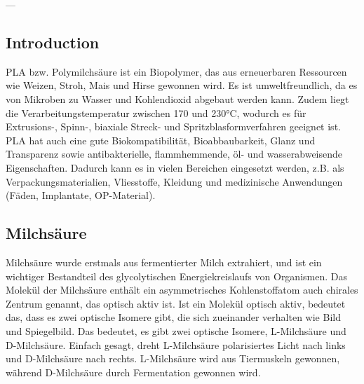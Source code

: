 \documentclass[10pt]{article}
\begin{document}
    ---

    \subsection{Introduction}
    PLA bzw. Polymilchsäure ist ein Biopolymer, das aus erneuerbaren Ressourcen wie Weizen, Stroh, Mais und Hirse gewonnen wird.
    Es ist umweltfreundlich, da es von Mikroben zu Wasser und Kohlendioxid abgebaut werden kann.
    Zudem liegt die Verarbeitungstemperatur zwischen 170 und 230°C, wodurch es für Extrusions-, Spinn-, biaxiale Streck- und Spritzblasformverfahren geeignet ist.
    PLA hat auch eine gute Biokompatibilität, Bioabbaubarkeit, Glanz und Transparenz sowie antibakterielle, flammhemmende, öl- und wasserabweisende Eigenschaften.
    Dadurch kann es in vielen Bereichen eingesetzt werden, z.B. als Verpackungsmaterialien, Vliesstoffe, Kleidung und medizinische Anwendungen (Fäden, Implantate, OP-Material).

    \subsection{Milchsäure}
    Milchsäure wurde erstmals aus fermentierter Milch extrahiert, und ist ein wichtiger Bestandteil des glycolytischen Energiekreislaufs von Organismen.
    Das Molekül der Milchsäure enthält ein asymmetrisches Kohlenstoffatom auch chirales Zentrum genannt, das optisch aktiv ist.
    Ist ein Molekül optisch aktiv, bedeutet das, dass es zwei optische Isomere gibt, die sich zueinander verhalten wie Bild und Spiegelbild.
    Das bedeutet, es gibt zwei optische Isomere, L-Milchsäure und D-Milchsäure.
    Einfach gesagt, dreht L-Milchsäure polarisiertes Licht nach links und D-Milchsäure nach rechts.
    L-Milchsäure wird aus Tiermuskeln gewonnen, während D-Milchsäure durch Fermentation gewonnen wird.
\end{document}
